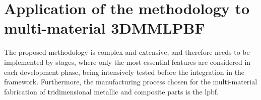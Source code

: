 % 
% 	
% 	
% 	
%	
\section{Application of the methodology to multi-material 3DMMLPBF}
The proposed methodology is complex and extensive, and therefore needs to be
implemented by stages, where only the most essential features are considered in
each development phase, being intensively tested before the integration in the
framework. Furthermore, the manufacturing process chosen for the multi-material
fabrication of tridimensional metallic and composite parts is the
\gls{lpbf}. 

